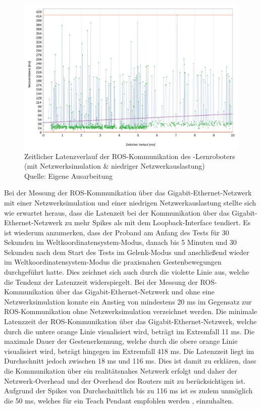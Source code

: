 \begin{figure}[htb]
	\centering
	\includegraphics[width=1.04\textwidth]{images/ergebnisse/ROS_App_und_mit_Netzwerksimulation}
	\caption[Zeitlicher Latenzverlauf der ROS-Kommunikation des -Lernroboters (mit Netzwerksimulation \& niedriger Netzwerkauslastung)]{Zeitlicher Latenzverlauf der ROS-Kommunikation des -Lernroboters (mit Netzwerksimulation \& niedriger Netzwerkauslastung)\\Quelle: Eigene Ausarbeitung}
	\label{fig:measurement_robot_ros_with_network_simulation_low_network_traffic}
\end{figure}
\FloatBarrier

Bei der Messung der ROS-Kommunikation über das Gigabit-Ethernet-Netzwerk mit einer Netzwerksimulation und einer niedrigen Netzwerkauslastung stellte sich wie erwartet heraus, dass die Latenzeit bei der Kommunikation über das Gigabit-Ethernet-Netzwerk zu mehr Spikes als mit dem Loopback-Interface tendiert. Es ist wiederum anzumerken, dass der Proband am Anfang des Tests für 30 Sekunden im Weltkoordinatensystem-Modus, danach bis 5 Minuten und 30 Sekunden nach dem Start des Tests im Gelenk-Modus und anschließend wieder im Weltkoordinatensystem-Modus die praxisnahen Gestenbewegungen durchgeführt hatte. Dies zeichnet sich auch durch die violette Linie aus, welche die Tendenz der Latenzzeit widerspiegelt. Bei der Messung der ROS-Kommunikation über das Gigabit-Ethernet-Netzwerk und ohne eine Netzwerksimulation konnte ein Anstieg von mindestens 20 ms im Gegensatz zur ROS-Kommunikation ohne Netzwerksimulation verzeichnet werden. Die minimale Latenzzeit der ROS-Kommunikation über das Gigabit-Ethernet-Netzwerk, welche durch die untere orange Linie visualisiert wird, beträgt im Extremfall \num{11} ms. Die maximale Dauer der Gestenerkennung, welche durch die obere orange Linie visualisiert wird, beträgt hingegen im Extremfall \num{418} ms. Die Latenzzeit liegt im Durchschnitt jedoch zwischen 18 ms und 116 ms. Dies ist damit zu erklären, dass die Kommunikation über ein realitätsnahes Netzwerk erfolgt und daher der Netzwerk-Overhead und der Overhead des Routers mit zu berücksichtigen ist. Aufgrund der Spikes von Durchschnittlich bis zu 116 ms ist es zudem unmöglich die 50 ms, welches für ein Teach Pendant empfohlen werden \cite[55]{prassler_advances_2004}, einzuhalten.

